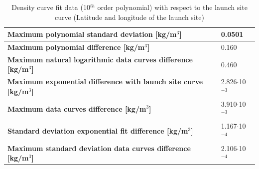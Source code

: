 %


%

\begin{table}[H]
\begin{center}
\caption{Density curve fit data (10$^{th}$ order polynomial) with respect to the launch site curve (Latitude and longitude of the launch site)}
\label{tab:fitDeviationsDen}
\begin{tabular}{|l|l|}
\hline 
\textbf{Maximum polynomial standard deviation [kg/m$^{3}$]} & 0.0501 \\ \hline

  \textbf{Maximum polynomial difference [kg/m$^{3}$]} & 0.160 \\ \hline
  
   \textbf{Maximum natural logarithmic data curves difference [kg/m$^{3}$]} & 0.460 \\ \hline
  
    \textbf{Maximum exponential difference with launch site curve [kg/m$^{3}$]} & 2.826$\cdot$10$^{-3}$ \\ \hline
    
       \textbf{Maximum data curves difference [kg/m$^{3}$]} & 3.910$\cdot$10$^{-3}$ \\ \hline
    
      \textbf{Standard deviation exponential fit difference [kg/m$^{3}$]} & 1.167$\cdot$10$^{-4}$ \\ \hline 
      
           \textbf{Maximum standard deviation data curves difference [kg/m$^{3}$]} & 2.106$\cdot$10$^{-4}$ \\ \hline
\end{tabular}
\end{center}
\end{table}



